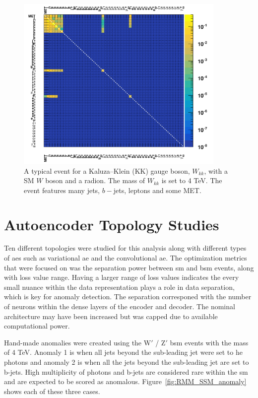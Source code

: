 \begin{figure}[H]
    \begin{center}
        \includegraphics[width=0.9\textwidth]{figs/app/validate_event1_radion.pdf}
    \end{center}
    \caption{
    A typical event for
    a Kaluza--Klein (KK) gauge boson, $W_{kk}$, with a SM $W$ boson and a radion.
    The mass of $W_{kk}$ is set to 4 TeV. 
    The event features many jets, $b-$jets, leptons and some  MET.
    }
\label{fig:rmm_tt5}
\end{figure}
\newpage

\vspace*{0.5in}

\section{Autoencoder Topology Studies}
\label{appendix:ae-topo-studies}
\setcounter{equation}{0}

Ten different topologies were studied for this analysis along with different types of \gls{ae}s such as variational \gls{ae} and the convolutional \gls{ae}. The optimization metrics that were focused on was the 
separation power between \gls{sm} and \gls{bsm} events, along with loss value range. Having a larger range of loss values indicates the every small nuance within the data representation plays a role in data 
separation, which is key for anomaly detection. The separation corresponed with the number of neurons within the dense layers of the encoder and decoder. The nominal architecture may have been increased but was capped 
due to available computational power. 
\par
Hand-made anomalies were created using the $\textrm{W}'$ / $\textrm{Z}'$ \gls{bsm} events with the mass of 4 TeV. Anomaly 1 is when all jets beyond the sub-leading jet were set to he photons and anomaly 2
is when all the jets beyond the sub-leading jet are set to b-jets. High multiplicity of photons and b-jets are considered rare within the \gls{sm} and are expected to be scored as anomalous. Figure~\ref{fig:RMM_SSM_anomaly}
shows each of these three cases. 

